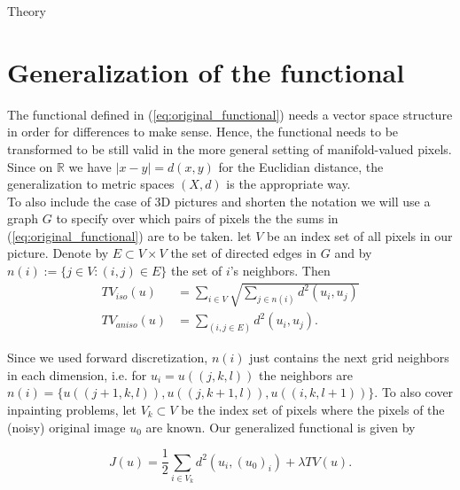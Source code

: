 \begin{chapter}{Theory}
\label{ch:theory}

\section{Generalization of the functional} %
\label{sec:Generalization of the functional}
The functional defined in (\ref{eq:original_functional}) needs a vector space structure in order for differences to make sense. Hence, the functional
needs to be transformed to be still valid in the more general setting of manifold-valued pixels. Since on $\mathbb{R}$ we have $|x-y|=d(x,y)$ for the 
Euclidian distance, the generalization to metric spaces $(X,d)$ is the appropriate way.\\

To also include the case of 3D pictures and shorten the notation we will use a graph $G$ to specify over which pairs of pixels the the sums in (\ref{eq:original_functional})
are to be taken. let $V$ be an index set of all pixels in our picture. Denote by $E\subset V\times V$ the set of directed edges in $G$ and by 
$n(i):=\lbrace j\in V: (i,j)\in E\rbrace$ the set of $i$'s neighbors. Then
\begin{align}
    TV_{iso}(u) &= \sum_{i\in V}\sqrt{\sum_{j\in n(i)}d^{2}(u_i,u_j)}\\
    TV_{aniso}(u) &= \sum_{(i,j\in E)}d^{2}(u_i,u_j).
\end{align}

Since we used forward discretization, $n(i)$ just contains the next grid neighbors in each dimension, i.e. for $u_i=u((j,k,l))$ the neighbors are 
$n(i)=\lbrace u((j+1,k,l)), u((j,k+1,l)), u((i,k,l+1)) \rbrace$. To also cover inpainting problems, let $V_k\subset V$ be the index set of pixels
where the pixels of the (noisy) original image $u_0$ are known. Our generalized functional is given by

\begin{equation}
    \label{eq:general_functional}
    J(u)=\frac{1}{2}\sum_{i\in V_k}d^2(u_i,(u_0)_i) +\lambda TV(u).
\end{equation}



\end{chapter}
